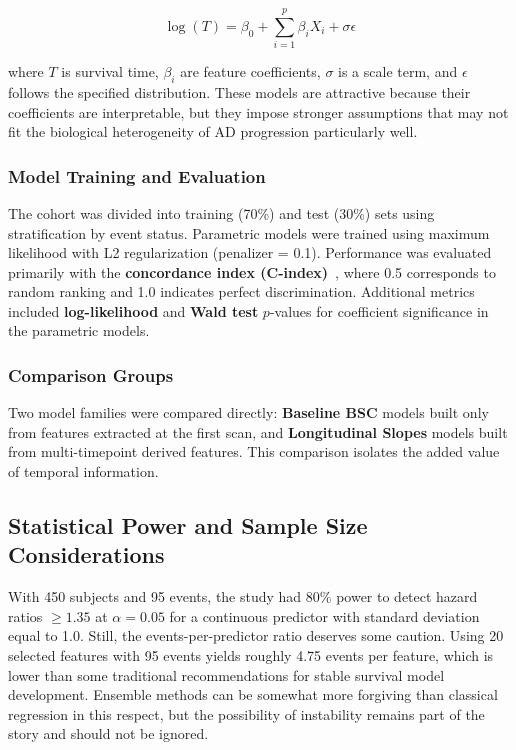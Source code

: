 \documentclass[blue]{ludusofficial}
\begin{document}
\begin{equation}
    \log(T) = \beta_0 + \sum_{i=1}^{p} \beta_i X_i + \sigma \epsilon
\end{equation}

where $T$ is survival time, $\beta_i$ are feature coefficients, $\sigma$ is a scale term, and $\epsilon$ follows the specified distribution. These models are attractive because their coefficients are interpretable, but they impose stronger assumptions that may not fit the biological heterogeneity of AD progression particularly well.

\subsubsection{Model Training and Evaluation}

The cohort was divided into training (70\%) and test (30\%) sets using stratification by event status. Parametric models were trained using maximum likelihood with L2 regularization (penalizer = 0.1). Performance was evaluated primarily with the \textbf{concordance index (C-index)}~\cite{uno2011cstat}, where 0.5 corresponds to random ranking and 1.0 indicates perfect discrimination. Additional metrics included \textbf{log-likelihood} and \textbf{Wald test} $p$-values for coefficient significance in the parametric models.

\subsubsection{Comparison Groups}

Two model families were compared directly: \textbf{Baseline BSC} models built only from features extracted at the first scan, and \textbf{Longitudinal Slopes} models built from multi-timepoint derived features. This comparison isolates the added value of temporal information.

\subsection{Statistical Power and Sample Size Considerations}

With 450 subjects and 95 events, the study had 80\% power to detect hazard ratios $\geq 1.35$ at $\alpha = 0.05$ for a continuous predictor with standard deviation equal to 1.0. Still, the events-per-predictor ratio deserves some caution. Using 20 selected features with 95 events yields roughly 4.75 events per feature, which is lower than some traditional recommendations for stable survival model development. Ensemble methods can be somewhat more forgiving than classical regression in this respect, but the possibility of instability remains part of the story and should not be ignored.
\end{document}
